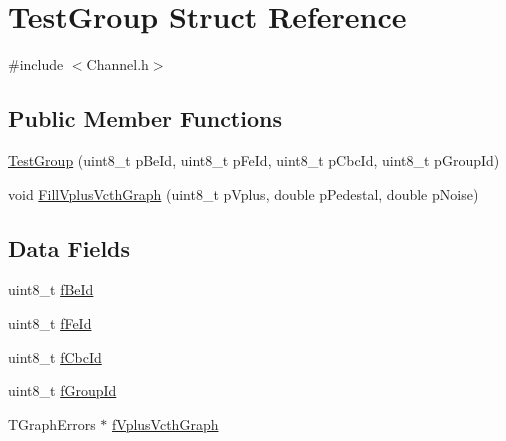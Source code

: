 \hypertarget{struct_test_group}{\section{Test\-Group Struct Reference}
\label{struct_test_group}
}


{\ttfamily \#include $<$Channel.\-h$>$}

\subsection*{Public Member Functions}
\begin{DoxyCompactItemize}
\item 
\hyperlink{struct_test_group_abc9cdcaaaeaf7be5d30db099ca8953cb}{Test\-Group} (uint8\-\_\-t p\-Be\-Id, uint8\-\_\-t p\-Fe\-Id, uint8\-\_\-t p\-Cbc\-Id, uint8\-\_\-t p\-Group\-Id)
\item 
void \hyperlink{struct_test_group_ab2b392dd24e0961bd115c0240d7a25ff}{Fill\-Vplus\-Vcth\-Graph} (uint8\-\_\-t p\-Vplus, double p\-Pedestal, double p\-Noise)
\end{DoxyCompactItemize}
\subsection*{Data Fields}
\begin{DoxyCompactItemize}
\item 
uint8\-\_\-t \hyperlink{struct_test_group_a220aae8ee3ae8c357f1787e3625431b4}{f\-Be\-Id}
\item 
uint8\-\_\-t \hyperlink{struct_test_group_a0eaafe2a6411b3865c90240b36b24840}{f\-Fe\-Id}
\item 
uint8\-\_\-t \hyperlink{struct_test_group_ac29315115540d3e0fc74b2dba3771162}{f\-Cbc\-Id}
\item 
uint8\-\_\-t \hyperlink{struct_test_group_a425092488cd04f3f22fdf8dfe0e877ed}{f\-Group\-Id}
\item 
T\-Graph\-Errors $\ast$ \hyperlink{struct_test_group_a1481302f545d48c3185534280d55b545}{f\-Vplus\-Vcth\-Graph}
\end{DoxyCompactItemize}


